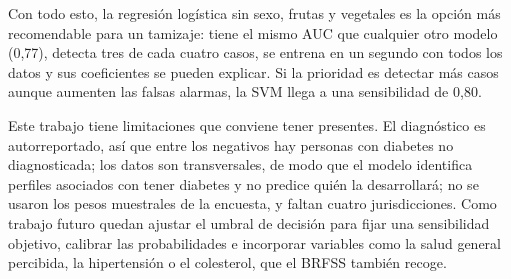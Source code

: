 Con todo esto, la regresión logística sin sexo, frutas y vegetales es la opción más recomendable para un tamizaje: tiene el mismo AUC que cualquier otro modelo (0,77), detecta tres de cada cuatro casos, se entrena en un segundo con todos los datos y sus coeficientes se pueden explicar. Si la prioridad es detectar más casos aunque aumenten las falsas alarmas, la SVM llega a una sensibilidad de 0,80.

Este trabajo tiene limitaciones que conviene tener presentes. El diagnóstico es autorreportado, así que entre los negativos hay personas con diabetes no diagnosticada; los datos son transversales, de modo que el modelo identifica perfiles asociados con tener diabetes y no predice quién la desarrollará; no se usaron los pesos muestrales de la encuesta, y faltan cuatro jurisdicciones. Como trabajo futuro quedan ajustar el umbral de decisión para fijar una sensibilidad objetivo, calibrar las probabilidades e incorporar variables como la salud general percibida, la hipertensión o el colesterol, que el BRFSS también recoge.

